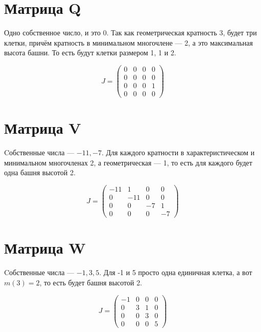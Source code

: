 \documentclass[12pt, a4paper]{article}
\begin{document}
    
    \section{Матрица Q}

    Одно собственное число, и это $0$.
    Так как геометрическая кратность 3, будет три клетки, 
    причём кратность в минимальном многочлене — 2, а это максимальная высота башни. То есть будут клетки размером 1, 1 и 2.
    
    \begin{equation}
        J = \left(\begin{matrix}
            0 & 0 & 0 & 0 \\
            0 & 0 & 0 & 0 \\
            0 & 0 & 0 & 1 \\
            0 & 0 & 0 & 0
        \end{matrix}\right)
    \end{equation}


    \section{Матрица V}

    Cобственные числа — $-11, -7$.
    Для каждого кратности в характеристическом и минимальном многочленах 2, а геометрическая — 1, 
    то есть для каждого будет одна башня высотой 2.
    
    \begin{equation}
        J = \left(\begin{matrix}
            -11 & 1 & 0 & 0 \\
            0 & -11 & 0 & 0 \\
            0 & 0 & -7 & 1 \\
            0 & 0 & 0 & -7
        \end{matrix}\right)
    \end{equation}

    
    \section{Матрица W}

    Cобственные числа — $-1, 3, 5$.
    Для -1 и 5 просто одна единичная клетка, а вот $m(3) = 2$, то есть будет башня высотой 2.
    
    \begin{equation}
        J = \left(\begin{matrix}
            -1 & 0 & 0 & 0 \\
            0 & 3 & 1 & 0 \\
            0 & 0 & 3 & 0 \\
            0 & 0 & 0 & 5
        \end{matrix}\right)
    \end{equation}
\end{document}

